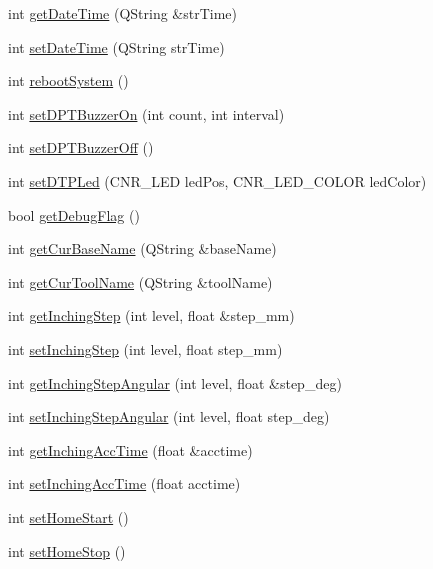 \begin{DoxyCompactItemize}
int \hyperlink{classCUIApp_a194fa60ec23503459897381d36f41706}{get\-Date\-Time} (Q\-String \&str\-Time)
\item 
int \hyperlink{classCUIApp_a62cfddfc18a235f0cfc6ea7e168f37ce}{set\-Date\-Time} (Q\-String str\-Time)
\item 
int \hyperlink{classCUIApp_a2ae1abae4dd4aaf40332b127c3fc5b13}{reboot\-System} ()
\item 
int \hyperlink{classCUIApp_a9b47dc610983417f16fcd26a78386814}{set\-D\-P\-T\-Buzzer\-On} (int count, int interval)
\item 
int \hyperlink{classCUIApp_a53a903ed784f511799d39a920d6c1618}{set\-D\-P\-T\-Buzzer\-Off} ()
\item 
int \hyperlink{classCUIApp_acb86ae6150571428671015ef6859826e}{set\-D\-T\-P\-Led} (C\-N\-R\-\_\-\-L\-E\-D led\-Pos, C\-N\-R\-\_\-\-L\-E\-D\-\_\-\-C\-O\-L\-O\-R led\-Color)
\item 
bool \hyperlink{classCUIApp_a779ad6bc661533b3c75a3f8f8cce2ece}{get\-Debug\-Flag} ()
\item 
int \hyperlink{classCUIApp_a1566cbcfdf9a3eb4f8c841edffa00dcc}{get\-Cur\-Base\-Name} (Q\-String \&base\-Name)
\item 
int \hyperlink{classCUIApp_a7536797eac45ecf5beb09f5fe2765b0a}{get\-Cur\-Tool\-Name} (Q\-String \&tool\-Name)
\item 
int \hyperlink{classCUIApp_a2b00b9e3246df2c98ab2303e3988049e}{get\-Inching\-Step} (int level, float \&step\-\_\-mm)
\item 
int \hyperlink{classCUIApp_a73b625566370601ba8a7c581b6426090}{set\-Inching\-Step} (int level, float step\-\_\-mm)
\item 
int \hyperlink{classCUIApp_ac424a7fd3fec4d813638342c80eefe64}{get\-Inching\-Step\-Angular} (int level, float \&step\-\_\-deg)
\item 
int \hyperlink{classCUIApp_a34d6c57d939b7b5750ace5b630f11114}{set\-Inching\-Step\-Angular} (int level, float step\-\_\-deg)
\item 
int \hyperlink{classCUIApp_a8f49d15e94fa3339041d11b121c0f81a}{get\-Inching\-Acc\-Time} (float \&acctime)
\item 
int \hyperlink{classCUIApp_a19bc933038b12820648d71d494719809}{set\-Inching\-Acc\-Time} (float acctime)
\item 
int \hyperlink{classCUIApp_aff9bfd02433068705595b74ed50b5d6e}{set\-Home\-Start} ()
\item 
int \hyperlink{classCUIApp_abcf462661e4d7a92b36a6a1bea7bc036}{set\-Home\-Stop} ()
\item 

\end{DoxyCompactItemize}
